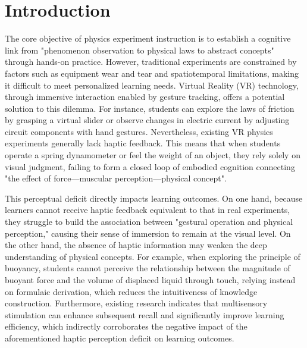 \documentclass[runningheads]{llncs}
\begin{document}
\section{Introduction}
The core objective of physics experiment instruction is to establish a cognitive link from "phenomenon observation to physical laws to abstract concepts" through hands-on practice\cite{civelek2014effects,bao2019physics,freeman2014active}. However, traditional experiments are constrained by factors such as equipment wear and tear and spatiotemporal limitations, making it difficult to meet personalized learning needs\cite{yang2007impact,ma2023investigation}. Virtual Reality (VR) technology, through immersive interaction enabled by gesture tracking, offers a potential solution to this dilemma\cite{yang2019gesture}. For instance, students can explore the laws of friction by grasping a virtual slider or observe changes in electric current by adjusting circuit components with hand gestures. Nevertheless, existing VR physics experiments generally lack haptic feedback. This means that when students operate a spring dynamometer or feel the weight of an object, they rely solely on visual judgment, failing to form a closed loop of embodied cognition connecting "the effect of force—muscular perception—physical concept"\cite{giri2021application}.

This perceptual deficit directly impacts learning outcomes. On one hand, because learners cannot receive haptic feedback equivalent to that in real experiments, they struggle to build the association between "gestural operation and physical perception," causing their sense of immersion to remain at the visual level\cite{app14114935}. On the other hand, the absence of haptic information may weaken the deep understanding of physical concepts. For example, when exploring the principle of buoyancy, students cannot perceive the relationship between the magnitude of buoyant force and the volume of displaced liquid through touch, relying instead on formulaic derivation, which reduces the intuitiveness of knowledge construction\cite{neri2024enhancing}. Furthermore, existing research indicates that multisensory stimulation can enhance subsequent recall and significantly improve learning efficiency, which indirectly corroborates the negative impact of the aforementioned haptic perception deficit on learning outcomes\cite{murray2023crossmodal}.
\end{document}
